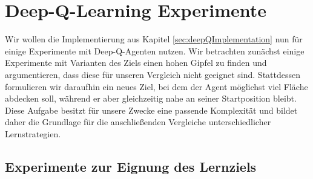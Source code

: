 \section{Deep-Q-Learning Experimente}
Wir wollen die Implementierung aus Kapitel \ref{sec:deepQImplementation} nun für einige Experimente mit Deep-Q-Agenten nutzen. Wir betrachten zunächst einige Experimente mit Varianten des Ziels einen hohen Gipfel zu finden und argumentieren, dass diese für unseren Vergleich nicht geeignet sind. Stattdessen formulieren wir daraufhin ein neues Ziel, bei dem der Agent möglichst viel Fläche abdecken soll, während er aber gleichzeitig nahe an seiner Startposition bleibt. Diese Aufgabe besitzt für unsere Zwecke eine passende Komplexität und bildet daher die Grundlage für die anschließenden Vergleiche unterschiedlicher Lernstrategien.

\subsection{Experimente zur Eignung des Lernziels} \label{sec:deepQFirstExperiments}
